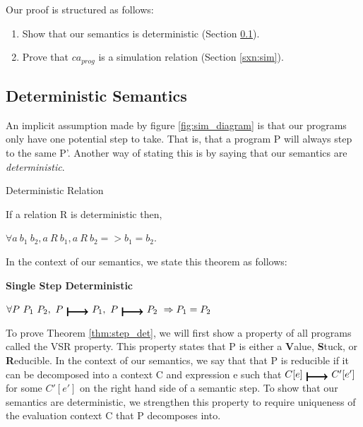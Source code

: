 Our proof is structured as follows:
\begin{enumerate}
    \item Show that our semantics is deterministic (Section \ref{sxn:det_sem}).
    \item Prove that $ca_{prog}$ is a simulation relation (Section \ref{sxn:sim}).
\end{enumerate}


\subsection{Deterministic Semantics}\label{sxn:det_sem}
An implicit assumption made by figure \ref{fig:sim_diagram} is that our programs only have one potential step to take. That is, that a program P will always step to the same P'. Another way of stating this is by saying that our semantics are \textit{deterministic}.

\begin{definition} Deterministic Relation

If a relation R is deterministic then,

$\forall a\ b_1\ b_2, a\ R\ b_1, a\ R\ b_2 => b_1 = b_2$.

\end{definition}

In the context of our semantics, we state this theorem as follows:

\begin{theorem}\label{thm:step_det}


\textbf{Single Step Deterministic}

$\forall P\ P_1\ P_2,\ P\ \step\ P_1,\ P\ \step\ P_2\ => P_1 = P_2$


\end{theorem}

To prove Theorem \ref{thm:step_det}, we will first show a property of all programs called the VSR property. This property states that P is either a \textbf{V}alue, \textbf{S}tuck, or \textbf{R}educible. In the context of our semantics, we say that that P is reducible if it can be decomposed into a context C and expression e such that $C[e]\ \step\ C'[e']$ for some $C'[e']$ on the right hand side of a semantic step. To show that our semantics are deterministic, we strengthen this property to require uniqueness of the evaluation context C that P decomposes into.

